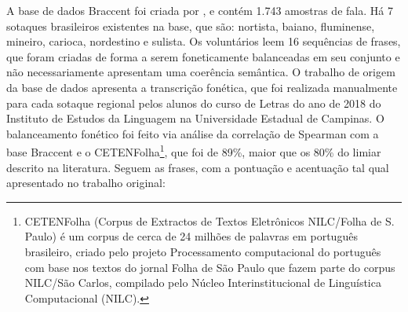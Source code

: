 A base de dados Braccent foi criada por , e contém 1.743 amostras de fala. Há 7 sotaques brasileiros existentes na base, que são: nortista, baiano, fluminense, mineiro, carioca, nordestino e sulista. Os voluntários leem 16 sequências de frases, que foram criadas de forma a serem foneticamente balanceadas em seu conjunto e não necessariamente apresentam uma coerência semântica. O trabalho de origem da base de dados apresenta a  transcrição fonética, que foi realizada manualmente para cada sotaque regional pelos alunos do curso de Letras do ano de 2018 do Instituto de Estudos da Linguagem na Universidade Estadual de Campinas. O balanceamento fonético foi feito via análise da correlação de Spearman com a base Braccent e o CETENFolha\footnote{CETENFolha (Corpus de Extractos de Textos Eletrônicos NILC/Folha de S. Paulo) é um corpus de cerca de 24 milhões de palavras em português brasileiro, criado pelo projeto Processamento computacional do português com base nos textos do jornal Folha de São Paulo que fazem parte do corpus NILC/São Carlos, compilado pelo Núcleo Interinstitucional de Linguística Computacional (NILC).}, que foi de 89\%, maior que os 80\% do limiar descrito na literatura. Seguem as frases, com a pontuação e acentuação tal qual apresentado no trabalho original:

